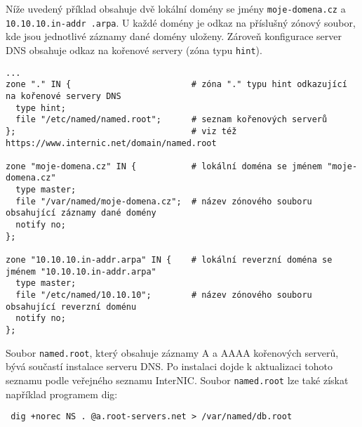 Níže uvedený příklad obsahuje dvě lokální domény se jmény {\tt moje-domena.cz} a {\tt 10.10.10.in-addr .arpa}. U každé domény je odkaz na příslušný zónový soubor, kde jsou jednotlivé záznamy dané domény uloženy. Zároveň konfigurace server DNS obsahuje odkaz na kořenové servery (zóna typu {\tt hint}). 
{\footnotesize
\begin{verbatim}
...
zone "." IN {                        # zóna "." typu hint odkazující na kořenové servery DNS
  type hint;
  file "/etc/named/named.root";      # seznam kořenových serverů
};                                   # viz též https://www.internic.net/domain/named.root

zone "moje-domena.cz" IN {           # lokální doména se jménem "moje-domena.cz"
  type master;
  file "/var/named/moje-domena.cz";  # název zónového souboru obsahující záznamy dané domény
  notify no;
};

zone "10.10.10.in-addr.arpa" IN {    # lokální reverzní doména se jménem "10.10.10.in-addr.arpa"
  type master;
  file "/etc/named/10.10.10";        # název zónového souboru obsahující reverzní doménu
  notify no;
};

\end{verbatim}
}
%
%
%
Soubor {\tt named.root}, který obsahuje záznamy A a AAAA kořenových serverů, bývá součastí instalace serveru DNS. Po instalaci dojde k aktualizaci tohoto seznamu podle veřejného seznamu InterNIC. Soubor {\tt named.root} lze také získat například programem dig:
\begin{verbatim}
 dig +norec NS . @a.root-servers.net > /var/named/db.root
\end{verbatim}

